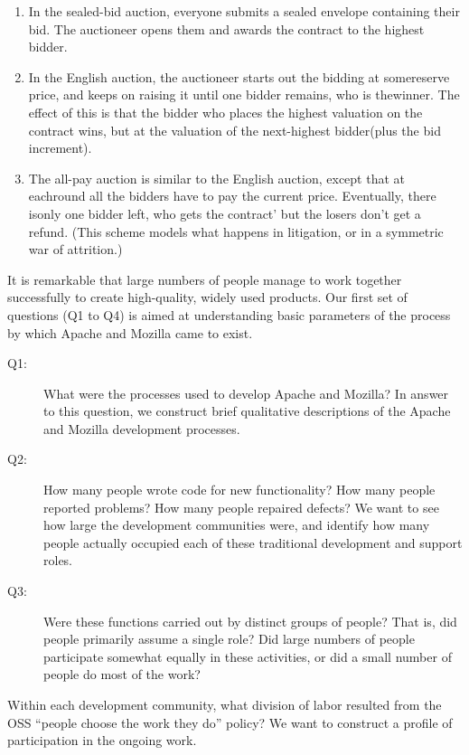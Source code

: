 \documentclass{mitpress}
\begin{document}
\begin{enumerate} 
\item In the sealed-bid auction, everyone submits a
sealed envelope containing their bid. The auctioneer opens them and
awards the contract to the highest bidder.

\item In the English auction, the
auctioneer starts out the bidding at somereserve price, and keeps on
raising it until one bidder remains, who is thewinner. The effect of
this is that the bidder who places the highest valuation on the
contract wins, but at the valuation of the next-highest bidder(plus
the bid increment).

\item
The all-pay auction is similar to the English
auction, except that at eachround all the bidders have to pay the
current price. Eventually, there isonly one bidder left, who gets the
contract' but the losers don't get a refund. (This scheme models
what happens in litigation, or in a symmetric war of attrition.)
\end{enumerate}



It is remarkable that large numbers of people manage to work
together successfully to create high-quality, widely used products. Our first
set of questions (Q1 to Q4) is aimed at understanding basic parameters of
the process by which Apache and Mozilla came to exist.

\begin{description}
\item[Q1:]What were the processes used to develop Apache and Mozilla?
In answer to this question, we construct brief qualitative descriptions of
the Apache and Mozilla development processes.

\item[Q2:]How many people wrote code for new functionality? How many people
reported problems? How many people repaired defects?
We want to see how large the development communities were, and
identify how many people actually occupied each of these traditional
development and support roles.

\item[Q3:]Were these functions carried out by distinct groups of people? That
is, did people primarily assume a single role? Did large numbers of people
participate somewhat equally in these activities, or did a small number of
people do most of the work?

\end{description}
Within each development community, what division of labor resulted
from the OSS ``people choose the work they do'' policy? We want to construct
a profile of participation in the ongoing work.
\end{document}
